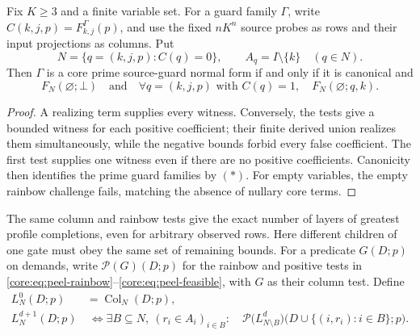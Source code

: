 \begin{corollary}
\label{core:cor:guard-peeling}
Fix $K\geq3$ and a finite variable set. For a guard family $\Gamma$,
write $C(k,j,p)=F^\Gamma_{k,j}(p)$, and use the fixed
$nK^n$ source probes as rows and their input projections as columns.
Put
\[
 N=\{q=(k,j,p):C(q)=0\},\qquad A_q=I\setminus\{k\}\quad(q\in N).
\]
Then $\Gamma$ is a core prime source-guard normal form if and only if
it is canonical and
\[
 F_N(\varnothing;\bot)\quad\text{and}\quad
 \forall q=(k,j,p)\text{ with }C(q)=1,\quad
 F_N(\varnothing;q,k).
\]
\end{corollary}
\begin{proof}
A realizing term supplies every witness. Conversely, the tests give a
bounded witness for each positive coefficient; their finite derived union
realizes them simultaneously, while the negative bounds forbid every
false coefficient. The first test supplies one witness even if there
are no positive coefficients. Canonicity then identifies the prime guard
families by $(*)$. For empty variables, the empty rainbow challenge fails,
matching the absence of nullary core terms.
\end{proof}

The same column and rainbow tests give the exact number of layers of
greatest profile completions, even for arbitrary observed rows.
Here different children of one gate must obey the same set of remaining
bounds. For a predicate $G(D;p)$ on demands, write $\mathcal P(G)(D;p)$
for the rainbow and positive tests in
\eqref{core:eq:peel-rainbow}--\eqref{core:eq:peel-feasible}, with $G$
as their column test. Define
\[
\begin{aligned}
 L^0_N(D;p)&=\operatorname{Col}_N(D;p),\\
 L^{d+1}_N(D;p)&\ \Longleftrightarrow \exists B\subseteq N,\ (r_i\in A_i)_{i\in B}:\quad
 \mathcal P\bigl(L^d_{N\setminus B}\bigr)
    \bigl(D\cup\{(i,r_i):i\in B\};p\bigr).
\end{aligned}
\]

